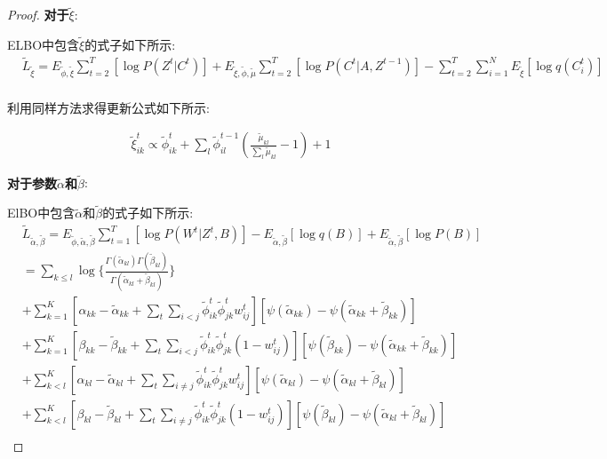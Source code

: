 \begin{proof}
	\textbf{对于$\widetilde{\xi}$}:
	
	ELBO中包含$\widetilde{\xi}$的式子如下所示:
	\begin{equation}
		\begin{split}
			&\widetilde{L}_{\widetilde{\xi}} = E_{\widetilde{\phi},\widetilde{\xi}} \sum_{t=2}^T [\log P(Z^t|C^t)] 
			+ E_{\widetilde{\xi},\widetilde{\phi},\widetilde{\mu}} \sum_{t=2}^T [\log P(C^t|A,Z^{t-1})] - \sum_{t=2}^T \sum_{i=1}^N E_{\widetilde{\xi}}[\log q(C_i^t)]\\
		\end{split}
	\end{equation}
	
	利用同样方法求得更新公式如下所示:
	
	\begin{equation}
		\label{appendix:eq5}
		\begin{split}
			\widetilde{\xi}_{ik}^t \propto \widetilde{\phi}_{ik}^t + \sum_l \widetilde{\phi}_{il}^{t-1}(\frac{\widetilde{\mu}_{kl}}{\sum_l \widetilde{\mu}_{kl}} - 1) + 1
		\end{split}
	\end{equation}
	
	\textbf{对于参数$\widetilde{\alpha}$和$\widetilde{\beta}$}:
	
	ElBO中包含$\widetilde{\alpha}$和$\widetilde{\beta}$的式子如下所示:
	\begin{equation}
		\begin{split}
			&\widetilde{L}_{\widetilde{\alpha},\widetilde{\beta}} = E_{\widetilde{\phi},\widetilde{\alpha},\widetilde{\beta}} \sum_{t=1}^T [\log P(W^t|Z^t,B)] 
			- E_{\widetilde{\alpha},\widetilde{\beta}}[\log q(B)] + E_{\widetilde{\alpha},\widetilde{\beta}}[\log P(B)]\\
			&= \sum_{k \leq l} \log\{\frac{\Gamma(\widetilde{\alpha}_{kl})\Gamma(\widetilde{\beta}_{kl})}{\Gamma(\widetilde{\alpha}_{kl}+\widetilde{\beta}_{kl})}   \}  \\
			&+ \sum_{k=1}^K [\alpha_{kk}- \widetilde{\alpha}_{kk} +\sum_t \sum_{i < j} \widetilde{\phi}_{ik}^t\widetilde{\phi}_{jk}^t w_{ij}^t]
			[\psi(\widetilde{\alpha}_{kk})-\psi (\widetilde{\alpha}_{kk}+\widetilde{\beta}_{kk})] \\
			&+ \sum_{k=1}^K [\beta_{kk}- \widetilde{\beta}_{kk} +\sum_t \sum_{i < j} \widetilde{\phi}_{ik}^t\widetilde{\phi}_{jk}^t(1- w_{ij}^t)]
			[\psi(\widetilde{\beta}_{kk})-\psi (\widetilde{\alpha}_{kk}+\widetilde{\beta}_{kk})] \\
			&+ \sum_{k<l}^K [\alpha_{kl}- \widetilde{\alpha}_{kl} +\sum_t \sum_{i \neq j} \widetilde{\phi}_{ik}^t\widetilde{\phi}_{jk}^t w_{ij}^t]
			[\psi(\widetilde{\alpha}_{kl})-\psi (\widetilde{\alpha}_{kl}+\widetilde{\beta}_{kl})] \\
			&+ \sum_{k<l}^K [\beta_{kl}- \widetilde{\beta}_{kl} +\sum_t \sum_{i \neq j} \widetilde{\phi}_{ik}^t\widetilde{\phi}_{jk}^t(1- w_{ij}^t)]
			[\psi(\widetilde{\beta}_{kl})-\psi (\widetilde{\alpha}_{kl}+\widetilde{\beta}_{kl})] \\
		\end{split}
	\end{equation}
	

\end{proof}

